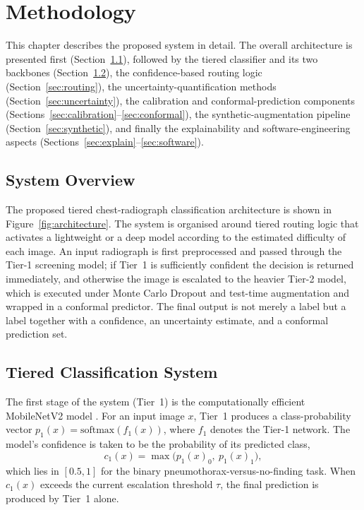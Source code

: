 \chapter{Methodology}
\label{ch:methodology}

This chapter describes the proposed system in detail. The overall architecture is presented first (Section~\ref{sec:overview}), followed by the tiered classifier and its two backbones (Section~\ref{sec:tiered}), the confidence-based routing logic (Section~\ref{sec:routing}), the uncertainty-quantification methods (Section~\ref{sec:uncertainty}), the calibration and conformal-prediction components (Sections~\ref{sec:calibration}--\ref{sec:conformal}), the synthetic-augmentation pipeline (Section~\ref{sec:synthetic}), and finally the explainability and software-engineering aspects (Sections~\ref{sec:explain}--\ref{sec:software}).

\section{System Overview}
\label{sec:overview}
The proposed tiered chest-radiograph classification architecture is shown in Figure~\ref{fig:architecture}. The system is organised around tiered routing logic that activates a lightweight or a deep model according to the estimated difficulty of each image. An input radiograph is first preprocessed and passed through the Tier-1 screening model; if Tier~1 is sufficiently confident the decision is returned immediately, and otherwise the image is escalated to the heavier Tier-2 model, which is executed under Monte Carlo Dropout and test-time augmentation and wrapped in a conformal predictor. The final output is not merely a label but a label together with a confidence, an uncertainty estimate, and a conformal prediction set.



\section{Tiered Classification System}
\label{sec:tiered}
The first stage of the system (Tier~1) is the computationally efficient MobileNetV2 model \cite{sandler2018mobilenetv2}. For an input image $x$, Tier~1 produces a class-probability vector $p_1(x) = \mathrm{softmax}(f_1(x))$, where $f_1$ denotes the Tier-1 network. The model's confidence is taken to be the probability of its predicted class,
\begin{equation}
    c_1(x) = \max\big(p_1(x)_0,\ p_1(x)_1\big),
\end{equation}
which lies in $[0.5, 1]$ for the binary pneumothorax-versus-no-finding task. When $c_1(x)$ exceeds the current escalation threshold $\tau$, the final prediction is produced by Tier~1 alone.

